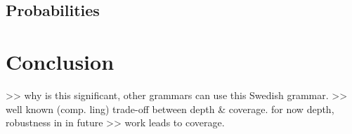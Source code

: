 \documentclass{report}
\begin{document}
\subsection{Probabilities}
\label{sec:futureProbabilities}


\section{Conclusion}
>> why is this significant, other grammars can use this Swedish grammar.
>> well known (comp. ling) trade-off between depth & coverage. for now depth, robustness in in future
>> work leads to coverage.




\end{document}
